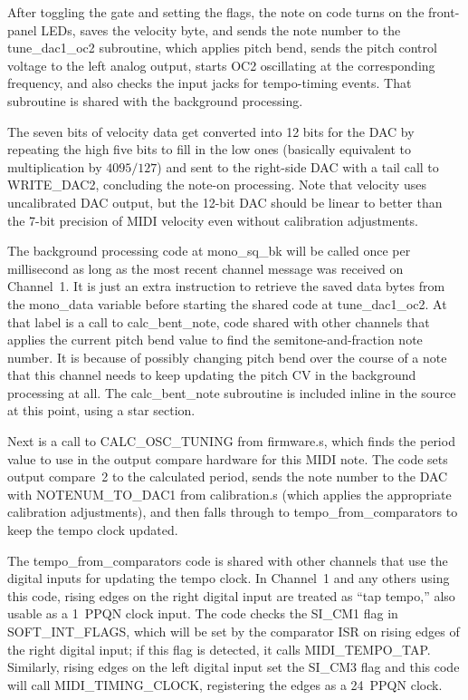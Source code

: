 After toggling the gate and setting the flags, the note on code turns on the
front-panel LEDs, saves the velocity byte, and sends the note number to the
tune\_dac1\_oc2 subroutine, which applies pitch bend, sends the pitch
control voltage to the left analog output, starts OC2 oscillating at the
corresponding frequency, and also checks the input jacks for tempo-timing
events.  That subroutine is shared with the background processing.

The seven bits of velocity data get converted into 12 bits for the DAC by
repeating the high five bits to fill in the low ones (basically equivalent
to multiplication by $4095/127$) and sent to the right-side DAC with a tail
call to WRITE\_DAC2, concluding the note-on processing.  Note that velocity
uses uncalibrated DAC output, but the 12-bit DAC should be linear to better
than the 7-bit precision of MIDI velocity even without calibration
adjustments.

The background processing code at mono\_sq\_bk will be called once per
millisecond as long as the most recent channel message was received on
Channel~1.  It is just an extra instruction to retrieve the saved data bytes
from the mono\_data variable before starting the shared code at
tune\_dac1\_oc2.  At that label is a call to calc\_bent\_note, code shared
with other channels that applies the current pitch bend value to find the
semitone-and-fraction note number.  It is because of possibly changing pitch
bend over the course of a note that this channel needs to keep updating the
pitch CV in the background processing at all.  The calc\_bent\_note
subroutine is included inline in the source at this point, using a star
section.

Next is a call to CALC\_OSC\_TUNING from firmware.s, which finds the period
value to use in the output compare hardware for this MIDI note.  The code
sets output compare~2 to the calculated period, sends the note number to the
DAC with NOTENUM\_TO\_DAC1 from calibration.s (which applies the appropriate
calibration adjustments), and then falls through to
tempo\_from\_comparators to keep the tempo clock updated.

The tempo\_from\_comparators code is shared with other channels that use the
digital inputs for updating the tempo clock.  In Channel~1 and any others
using this code, rising edges on the right digital input are treated as ``tap
tempo,'' also usable as a 1~PPQN clock input.  The code checks the SI\_CM1
flag in SOFT\_INT\_FLAGS, which will be set by the comparator ISR on rising
edges of the right digital input; if this flag is detected, it calls
MIDI\_TEMPO\_TAP.  Similarly, rising edges on the left digital input set the
SI\_CM3 flag and this code will call MIDI\_TIMING\_CLOCK, registering the
edges as a 24~PPQN clock.

